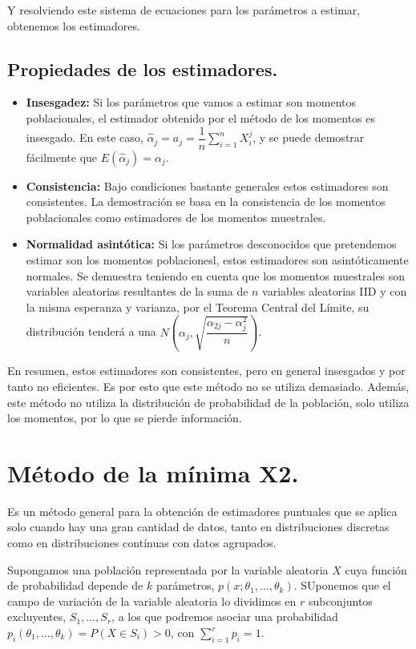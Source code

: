 Y resolviendo este sistema de ecuaciones para los par\'ametros a estimar, obtenemos los estimadores.

\subsection{Propiedades de los estimadores.}
\begin{itemize}
\item \textbf{Insesgadez:} Si los par\'ametros que vamos a estimar son momentos poblacionales, el estimador obtenido por el m\'etodo de los momentos es insesgado.
En este caso, $\hat{\alpha}_j=a_j=\dfrac{1}{n}\sum_{i=1}^nX_i^j$, y se puede demostrar f\'acilmente que $E(\hat{\alpha}_j)=\alpha_j$.
\item \textbf{Consistencia:} Bajo condiciones bastante generales estos estimadores son consistentes. La demostraci\'on se basa en la consistencia de los momentos poblacionales como estimadores de los momentos muestrales.
\item \textbf{Normalidad asint\'otica:} Si los par\'ametros desconocidos que pretendemos estimar son los momentos poblacionesl, estos estimadores son asint\'oticamente normales.
Se demuestra teniendo en cuenta que los momentos muestrales son variables aleatorias resultantes de la suma de $n$ variables aleatorias IID y con la misma esperanza y varianza, por el Teorema Central del L\'imite, su distribuci\'on tender\'a a una $N(\alpha_j,\sqrt{\dfrac{\alpha_{2j}-\alpha_j^2}{n}})$.

\end{itemize}

En resumen, estos estimadores son consistentes, pero en general insesgados y por tanto no eficientes. Es por esto que este m\'etodo no se utiliza demasiado. Adem\'as, este m\'etodo no utiliza la distribuci\'on de probabilidad de la poblaci\'on, solo utiliza los momentos, por lo que se pierde informaci\'on.

\section{M\'etodo de la m\'inima X2.}

Es un m\'etodo general para la obtenci\'on de estimadores puntuales que se aplica solo cuando hay una gran cantidad de datos, tanto en distribuciones discretas como en distribuciones cont\'inuas con datos agrupados.

Supongamos una poblaci\'on representada por la variable aleatoria $X$ cuya funci\'on de probabilidad depende de $k$ par\'ametros, $p(x;\theta_1,\ldots,\theta_k)$. SUponemos que el campo de variaci\'on de la variable aleatoria lo dividimos en $r$ subconjuntos excluyentes, $S_1,\ldots,S_r$, a los que podremos asociar una probabilidad $p_i(\theta_1,\ldots,\theta_k)=P(X\in S_i)>0$, con $\sum_{i=1}^rp_i=1$.


